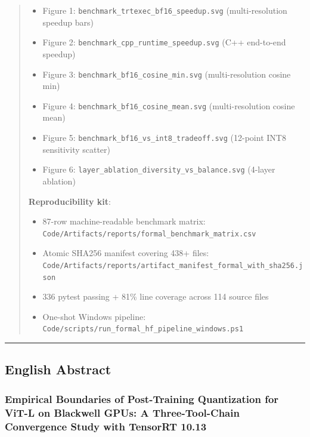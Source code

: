 \documentclass[
]{article}
\providecommand{\tightlist}{%
  \setlength{\itemsep}{0pt}\setlength{\parskip}{0pt}}
\begin{document}
\begin{quote}
\begin{itemize}
\tightlist
\item
  Figure 1: \texttt{benchmark\_trtexec\_bf16\_speedup.svg}
  (multi-resolution speedup bars)
\item
  Figure 2: \texttt{benchmark\_cpp\_runtime\_speedup.svg} (C++
  end-to-end speedup)
\item
  Figure 3: \texttt{benchmark\_bf16\_cosine\_min.svg} (multi-resolution
  cosine min)
\item
  Figure 4: \texttt{benchmark\_bf16\_cosine\_mean.svg} (multi-resolution
  cosine mean)
\item
  Figure 5: \texttt{benchmark\_bf16\_vs\_int8\_tradeoff.svg} (12-point
  INT8 sensitivity scatter)
\item
  Figure 6: \texttt{layer\_ablation\_diversity\_vs\_balance.svg}
  (4-layer ablation)
\end{itemize}

\textbf{Reproducibility kit}:

\begin{itemize}
\tightlist
\item
  87-row machine-readable benchmark matrix:
  \texttt{Code/Artifacts/reports/formal\_benchmark\_matrix.csv}
\item
  Atomic SHA256 manifest covering 438+ files:
  \texttt{Code/Artifacts/reports/artifact\_manifest\_formal\_with\_sha256.json}
\item
  336 pytest passing + 81\% line coverage across 114 source files
\item
  One-shot Windows pipeline:
  \texttt{Code/scripts/run\_formal\_hf\_pipeline\_windows.ps1}
\end{itemize}
\end{quote}

\begin{center}\rule{0.5\linewidth}{0.5pt}\end{center}

\subsection{English Abstract}\label{english-abstract}

\subsubsection{Empirical Boundaries of Post-Training Quantization for
ViT-L on Blackwell GPUs: A Three-Tool-Chain Convergence Study with
TensorRT
10.13}\label{empirical-boundaries-of-post-training-quantization-for-vit-l-on-blackwell-gpus-a-three-tool-chain-convergence-study-with-tensorrt-1013}
\end{document}
